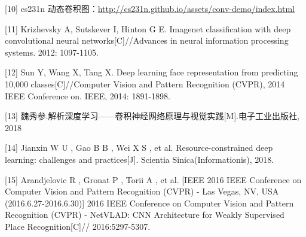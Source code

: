 {[}10{]} cs231n
动态卷积图：\url{http://cs231n.github.io/assets/conv-demo/index.html}

{[}11{]} Krizhevsky A, Sutskever I, Hinton G E. Imagenet classification
with deep convolutional neural networks{[}C{]}//Advances in neural
information processing systems. 2012: 1097-1105.

{[}12{]} Sun Y, Wang X, Tang X. Deep learning face representation from
predicting 10,000 classes{[}C{]}//Computer Vision and Pattern
Recognition (CVPR), 2014 IEEE Conference on. IEEE, 2014: 1891-1898.

{[}13{]}
魏秀参.解析深度学习------卷积神经网络原理与视觉实践{[}M{]}.电子工业出版社,
2018

{[}14{]} Jianxin W U , Gao B B , Wei X S , et al. Resource-constrained
deep learning: challenges and practices{[}J{]}. Scientia
Sinica(Informationis), 2018.

{[}15{]} Arandjelovic R , Gronat P , Torii A , et al. {[}IEEE 2016 IEEE
Conference on Computer Vision and Pattern Recognition (CVPR) - Las
Vegas, NV, USA (2016.6.27-2016.6.30){]} 2016 IEEE Conference on Computer
Vision and Pattern Recognition (CVPR) - NetVLAD: CNN Architecture for
Weakly Supervised Place Recognition{[}C{]}// 2016:5297-5307.

